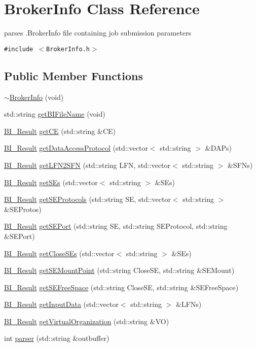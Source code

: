 \hypertarget{classBrokerInfo}{
\section{Broker\-Info Class Reference}
\label{classBrokerInfo}
}
parses .Broker\-Info file containing job submission parameters  


{\tt \#include $<$Broker\-Info.h$>$}

\subsection*{Public Member Functions}
\begin{CompactItemize}
\item 
\hyperlink{classBrokerInfo_a0}{$\sim$Broker\-Info} (void)
\item 
std::string \hyperlink{classBrokerInfo_a1}{get\-BIFile\-Name} (void)
\item 
\hyperlink{bi__result_8h_a2}{BI\_\-Result} \hyperlink{classBrokerInfo_a2}{get\-CE} (std::string \&CE)
\item 
\hyperlink{bi__result_8h_a2}{BI\_\-Result} \hyperlink{classBrokerInfo_a3}{get\-Data\-Access\-Protocol} (std::vector$<$ std::string $>$ \&DAPs)
\item 
\hyperlink{bi__result_8h_a2}{BI\_\-Result} \hyperlink{classBrokerInfo_a4}{get\-LFN2SFN} (std::string LFN, std::vector$<$ std::string $>$ \&SFNs)
\item 
\hyperlink{bi__result_8h_a2}{BI\_\-Result} \hyperlink{classBrokerInfo_a5}{get\-SEs} (std::vector$<$ std::string $>$ \&SEs)
\item 
\hyperlink{bi__result_8h_a2}{BI\_\-Result} \hyperlink{classBrokerInfo_a6}{get\-SEProtocols} (std::string SE, std::vector$<$ std::string $>$ \&SEProtos)
\item 
\hyperlink{bi__result_8h_a2}{BI\_\-Result} \hyperlink{classBrokerInfo_a7}{get\-SEPort} (std::string SE, std::string SEProtocol, std::string \&SEPort)
\item 
\hyperlink{bi__result_8h_a2}{BI\_\-Result} \hyperlink{classBrokerInfo_a8}{get\-Close\-SEs} (std::vector$<$ std::string $>$ \&SEs)
\item 
\hyperlink{bi__result_8h_a2}{BI\_\-Result} \hyperlink{classBrokerInfo_a9}{get\-SEMount\-Point} (std::string Close\-SE, std::string \&SEMount)
\item 
\hyperlink{bi__result_8h_a2}{BI\_\-Result} \hyperlink{classBrokerInfo_a10}{get\-SEFree\-Space} (std::string Close\-SE, std::string \&SEFree\-Space)
\item 
\hyperlink{bi__result_8h_a2}{BI\_\-Result} \hyperlink{classBrokerInfo_a11}{get\-Input\-Data} (std::vector$<$ std::string $>$ \&LFNs)
\item 
\hyperlink{bi__result_8h_a2}{BI\_\-Result} \hyperlink{classBrokerInfo_a12}{get\-Virtual\-Organization} (std::string \&VO)
\item 
int \hyperlink{classBrokerInfo_a13}{parser} (std::string \&outbuffer)
\end{CompactItemize}

